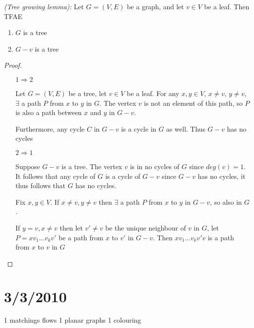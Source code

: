 \documentclass{article}
\begin{document}
\begin{lem}
\label{treegrow}
\emph{(Tree growing lemma):} Let $G=(V,E)$ be a graph, and let $v \in V$ be a leaf.  Then TFAE
\begin{enumerate}
 \item $G$ is a tree
\item $G-v$ is a tree
\end{enumerate}
\end{lem}

\begin{proof}
\begin{itemize}
\item[$1 \Rightarrow 2$]

Let $G=(V,E)$ be a tree, let $v \in V$ be a leaf.  For any $x,y \in V$, $x \neq v$, $y \neq v$, $\exists$ a path $P$ from $x$ to $y$ in $G$.  The vertex $v$ is not an element of this path, so $P$ is also a path between $x$ and $y$ in $G-v$.

Furthermore, any cycle $C$ in $G-v$ is a cycle in $G$ as well.  Thus $G-v$ has no cycles

\item[$2 \Rightarrow 1$]

Suppose $G-v$ is a tree.  The vertex $v$ is in no cycles of $G$ since $deg(v)=1$.  It follows that any cycle of $G$ is a cycle of $G-v$ since $G-v$ has no cycles, it thus follows that $G$ has no cycles.

Fix $x,y \in V$.  If $x \neq v, y \neq v$ then $\exists$ a path $P$ from $x$ to $y$ in $G-v$, so also in $G$.

If $y=v, x \neq v$ then let $v' \neq v$ be the unique neighbour of $v$ in $G$, let $P = x v_1 \ldots v_k v'$ be a path from $x$ to $v'$ in $G-v$.  Then $x v_1 \ldots v_k v' v$ is a path from $x$ to $v$ in $G$
\end{itemize}
\end{proof}

\section*{3/3/2010}

1 matchings flows
1 planar graphs
1 colouring
\end{document}
